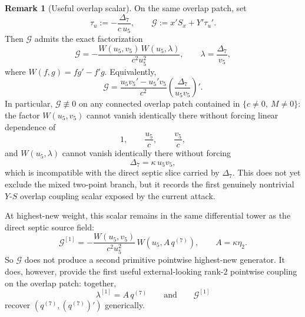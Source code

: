\documentclass[11pt,a4paper]{amsart}
\theoremstyle{plain}
\theoremstyle{definition}
\newtheorem{remark}[theorem]{Remark}
\begin{document}
\begin{remark}[Useful overlap scalar]
\label{rem:structural-mixed-overlap-scalar-two-point}
On the same overlap patch, set
\[
\tau_u:=-\frac{\Delta_7}{c\,u_5},
\qquad
\mathcal G:=x'S_x+Y'\tau_u'.
\]
Then $\mathcal G$ admits the exact factorization
\[
\mathcal G
=
-\frac{W(u_5,v_5)\,W(u_5,\lambda)}{c^2u_5^2},
\qquad
\lambda=\frac{\Delta_7}{v_5},
\]
where $W(f,g)=fg'-f'g$. Equivalently,
\[
\mathcal G
=
\frac{u_5v_5'-u_5'v_5}{c^2}
\left(\frac{\Delta_7}{u_5v_5}\right)'.
\]
In particular, $\mathcal G\not\equiv 0$ on any connected overlap patch
contained in $\{c\neq 0,\ M\neq 0\}$: the factor $W(u_5,v_5)$ cannot vanish
identically there without forcing linear dependence of
\[
1,\qquad \frac{u_5}{c},\qquad \frac{v_5}{c},
\]
and $W(u_5,\lambda)$ cannot vanish identically there without forcing
\[
\Delta_7=\kappa\,u_5v_5,
\]
which is incompatible with the direct septic slice carried by $\Delta_7$.
This does not yet exclude the mixed two-point branch, but it records the first
genuinely nontrivial $Y$-$S$ overlap coupling scalar exposed by the current
attack.

At highest-new weight, this scalar remains in the same differential tower as
the direct septic source field:
\[
\mathcal G^{[1]}
=
-\frac{W(u_5,v_5)}{c^2u_5^2}\,W(u_5,A\,q^{(7)}),
\qquad
A=\kappa\eta_2.
\]
So $\mathcal G$ does not produce a second primitive pointwise highest-new
generator. It does, however, provide the first useful external-looking rank-$2$
pointwise coupling on the overlap patch: together,
\[
\lambda^{[1]}=A\,q^{(7)}
\qquad\text{and}\qquad
\mathcal G^{[1]}
\]
recover $(q^{(7)},(q^{(7)})')$ generically.
\end{remark}
\end{document}
